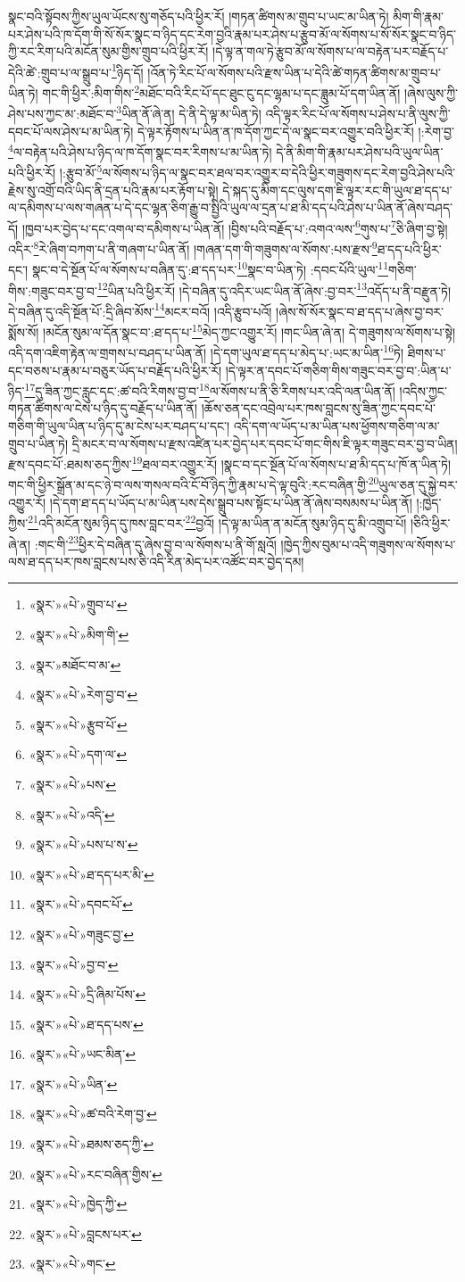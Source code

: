 སྣང་བའི་སྟོབས་ཀྱིས་ཡུལ་ཡོངས་སུ་གཅོད་པའི་ཕྱིར་རོ། །གཏན་ཚིགས་མ་གྲུབ་པ་ཡང་མ་ཡིན་ཏེ། མིག་གི་རྣམ་པར་ཤེས་པའི་ཁ་དོག་གི་སོ་སོར་སྣང་བ་ཉིད་དང་རེག་བྱའི་རྣམ་པར་ཤེས་པ་རྩུབ་མོ་ལ་སོགས་པ་སོ་སོར་སྣང་བ་ཉིད་ཀྱི་རང་རིག་པའི་མངོན་སུམ་གྱིས་གྲུབ་པའི་ཕྱིར་རོ། །དེ་ལྟ་ན་གལ་ཏེ་རྩུབ་མོ་ལ་སོགས་པ་ལ་བརྟེན་པར་བརྗོད་པ་དེའི་ཚེ་:གྲུབ་པ་ལ་སྒྲུབ་པ་\footnote{«སྣར་»«པེ་»གྲུབ་པ་}ཉིད་དོ། །འོན་ཏེ་རིང་པོ་ལ་སོགས་པའི་རྫས་ཡིན་པ་དེའི་ཚེ་གཏན་ཚིགས་མ་གྲུབ་པ་ཡིན་ཏེ། གང་གི་ཕྱིར་:མིག་གིས་\footnote{«སྣར་»«པེ་»མིག་གི་}མཐོང་བའི་རིང་པོ་དང་ཐུང་ངུ་དང་ལྷམ་པ་དང་ཟླུམ་པོ་དག་ཡིན་ནོ། །ཞེས་ལུས་ཀྱི་ཤེས་པས་ཀྱང་མ་:མཐོང་བ་\footnote{«སྣར་»མཐོང་བ་མ་}ཡིན་ནོ་ཞེ་ན། དེ་ནི་དེ་ལྟ་མ་ཡིན་ཏེ། འདི་ལྟར་རིང་པོ་ལ་སོགས་པ་ཤེས་པ་ནི་ལུས་ཀྱི་དབང་པོ་ལས་ཤེས་པ་མ་ཡིན་ཏེ། དེ་ལྟར་རྟོགས་པ་ཡིན་ན་ཁ་དོག་ཀྱང་དེ་ལ་སྣང་བར་འགྱུར་བའི་ཕྱིར་རོ། །:རེག་བྱ་\footnote{«སྣར་»«པེ་»རེག་བྱ་བ་}ལ་བརྟེན་པའི་ཤེས་པ་ཉིད་ལ་ཁ་དོག་སྣང་བར་རིགས་པ་མ་ཡིན་ཏེ། དེ་ནི་མིག་གི་རྣམ་པར་ཤེས་པའི་ཡུལ་ཡིན་པའི་ཕྱིར་རོ། །:རྩུབ་མོ་\footnote{«སྣར་»«པེ་»རྩུབ་པོ་}ལ་སོགས་པ་ཉིད་ལ་སྣང་བར་ཐལ་བར་འགྱུར་བ་དེའི་ཕྱིར་གཟུགས་དང་རེག་བྱའི་ཤེས་པའི་རྗེས་སུ་འགྲོ་བའི་ཡིད་ནི་དྲན་པའི་རྣམ་པར་རྟོག་པ་སྟེ། དེ་སྐད་དུ་མིག་དང་ལུས་དག་ཇི་ལྟར་རང་གི་ཡུལ་ཐ་དད་པ་ལ་དམིགས་པ་ལས་གཞན་པ་དེ་དང་ལྷན་ཅིག་རྒྱུ་བ་སྤྱིའི་ཡུལ་ལ་དྲན་པ་ཐ་མི་དད་པའི་ཤེས་པ་ཡིན་ནོ་ཞེས་བཤད་དོ། །ཁྱབ་པར་བྱེད་པ་དང་འགལ་བ་དམིགས་པ་ཡིན་ནོ། །བྱིས་པའི་བརྗོད་པ་:འགའ་ལས་\footnote{«སྣར་»«པེ་»དག་ལ་}གུས་པ་\footnote{«སྣར་»«པེ་»པས་}ཅི་ཞིག་བྱ་སྟེ། འདིར་\footnote{«སྣར་»«པེ་»འདི་}རེ་ཞིག་བཀག་པ་ནི་གཞག་པ་ཡིན་ནོ། །གཞན་དག་གི་གཟུགས་ལ་སོགས་:པས་རྫས་\footnote{«སྣར་»«པེ་»པས་པ་ས་}ཐ་དད་པའི་ཕྱིར་དང་། སྣང་བ་དེ་སྔོན་པོ་ལ་སོགས་པ་བཞིན་དུ་:ཐ་དད་པར་\footnote{«སྣར་»«པེ་»ཐ་དད་པར་མི་}སྣང་བ་ཡིན་ཏེ། :དབང་པོའི་ཡུལ་\footnote{«སྣར་»«པེ་»དབང་པོ་}གཅིག་གིས་:གཟུང་བར་བྱ་བ་\footnote{«སྣར་»«པེ་»གཟུང་བྱ་}ཡིན་པའི་ཕྱིར་རོ། །དེ་བཞིན་དུ་འདིར་ཡང་ཡིན་ནོ་ཞེས་:བྱ་བར་\footnote{«སྣར་»«པེ་»བྱ་བ་}འདོད་པ་ནི་བརྫུན་ཏེ། དེ་བཞིན་དུ་འདི་སྔོན་པོ་:དྲི་ཞིབ་མོས་\footnote{«སྣར་»«པེ་»དྲི་ཞིམ་པོས་}མངར་བའོ། །འདི་རྩུབ་པའོ། །ཞེས་སོ་སོར་སྣང་བ་ཐ་དད་པ་ཞེས་བྱ་བར་སྨོས་སོ། །མངོན་སུམ་ལ་དོན་སྣང་བ་:ཐ་དད་པ་\footnote{«སྣར་»«པེ་»ཐ་དད་པས་}མེད་ཀྱང་འགྱུར་རོ། །གང་ཡིན་ཞེ་ན། དེ་གཟུགས་ལ་སོགས་པ་སྟེ། འདི་དག་འཇིག་རྟེན་ལ་གྲགས་པ་བཤད་པ་ཡིན་ནོ། །དེ་དག་ཡུལ་ཐ་དད་པ་མེད་པ་:ཡང་མ་ཡིན་\footnote{«སྣར་»«པེ་»ཡང་མིན་}ཏེ། ཐིགས་པ་དང་བཅས་པ་རྣམ་པ་བཅུར་ཡོད་པ་བརྗོད་པའི་ཕྱིར་རོ། །དེ་ལྟར་ན་དབང་པོ་གཅིག་གིས་གཟུང་བར་བྱ་བ་:ཡིན་པ་ཉིད་\footnote{«སྣར་»«པེ་»ཡིན་}དུ་ཟིན་ཀྱང་རླུང་དང་:ཚ་བའི་རིགས་བྱ་བ་\footnote{«སྣར་»«པེ་»ཚ་བའི་རེག་བྱ་}ལ་སོགས་པ་ནི་ཅི་རིགས་པར་འདི་ལན་ཡིན་ནོ། །འདིས་ཀྱང་གཏན་ཚིགས་ལ་ངེས་པ་ཉིད་དུ་བརྗོད་པ་ཡིན་ནོ། །ཆོས་ཅན་དང་འབྲེལ་པར་ཁས་བླངས་སུ་ཟིན་ཀྱང་དབང་པོ་གཅིག་གི་ཡུལ་ཡིན་པ་ཉིད་དུ་མ་ངེས་པར་བཤད་པ་དང་། འདི་དག་ལ་ཡོད་པ་མ་ཡིན་པས་ཕྱོགས་གཅིག་ལ་མ་གྲུབ་པ་ཡིན་ཏེ། དྲི་མངར་བ་ལ་སོགས་པ་རྫས་འཛིན་པར་བྱེད་པར་དབང་པོ་གང་གིས་ཇི་ལྟར་གཟུང་བར་བྱ་བ་ཡིན། རྫས་དབང་པོ་:ཐམས་ཅད་ཀྱིས་\footnote{«སྣར་»«པེ་»ཐམས་ཅད་ཀྱི་}ཐལ་བར་འགྱུར་རོ། །སྣང་བ་དང་སྔོན་པོ་ལ་སོགས་པ་ཐ་མི་དད་པ་ཁོ་ན་ཡིན་ཏེ། གང་གི་ཕྱིར་སྒྲོན་མ་དང་ཉེ་བ་ལས་གསལ་བའི་ངོ་བོ་ཉིད་ཀྱི་རྣམ་པ་དེ་ལྟ་བུའི་:རང་བཞིན་གྱི་\footnote{«སྣར་»«པེ་»རང་བཞིན་གྱིས་}ཡུལ་ཅན་དུ་སྐྱེ་བར་འགྱུར་རོ། །དེ་དག་ཐ་དད་པ་ཡོད་པ་མ་ཡིན་པས་དེས་སྒྲུབ་པས་སྟོང་པ་ཡིན་ནོ་ཞེས་བསམས་པ་ཡིན་ནོ། །:ཁྱེད་ཀྱིས་\footnote{«སྣར་»«པེ་»ཁྱེད་ཀྱི་}འདི་མངོན་སུམ་ཉིད་དུ་ཁས་བླང་བར་\footnote{«སྣར་»«པེ་»བླངས་པར་}བྱའོ། །དེ་ལྟ་མ་ཡིན་ན་མངོན་སུམ་ཉིད་དུ་མི་འགྲུབ་པོ། །ཅིའི་ཕྱིར་ཞེ་ན། :གང་གི་\footnote{«སྣར་»«པེ་»གང་}ཕྱིར་དེ་བཞིན་དུ་ཞེས་བྱ་བ་ལ་སོགས་པ་ནི་གོ་སླའོ། །ཁྱེད་ཀྱིས་བུམ་པ་འདི་གཟུགས་ལ་སོགས་པ་ལས་ཐ་དད་པར་ཁས་བླངས་པས་ཅི་འདི་རིན་མེད་པར་འཚོང་བར་བྱེད་དམ། 